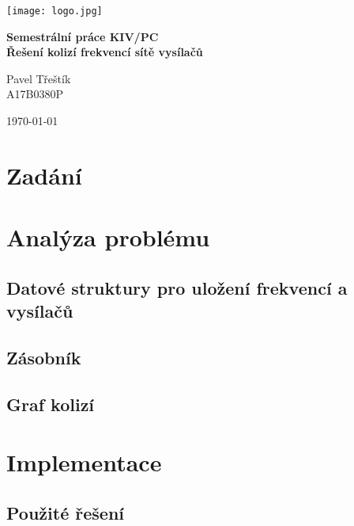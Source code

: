 \documentclass[12pt]{article}
\begin{document}
\begin{titlepage}
\texttt{[image: logo.jpg]}
\begin{center}
\vspace{5cm}
{\Huge
\textbf{Semestrální práce KIV/PC}\\
\vspace{1cm}
}
{\Large
\textbf{Řešení kolizí frekvencí sítě vysílačů}
}
\end{center}
\vspace{\fill}

\begin{minipage}[t]{5cm}
\flushleft
Pavel Třeštík\\
A17B0380P
\end{minipage}
\hfill
\begin{minipage}[t]{7cm}
\flushright
\today
\end{minipage}
\end{titlepage}

\tableofcontents
\newpage
{}
%
%
\section{Zadání}

%
%

\pagebreak
\section{Analýza problému}
\subsection{Datové struktury pro uložení frekvencí a vysílačů}
\subsection{Zásobník}
\subsection{Graf kolizí}
%
%

\section{Implementace}
\subsection{Použité řešení}
\end{document}
